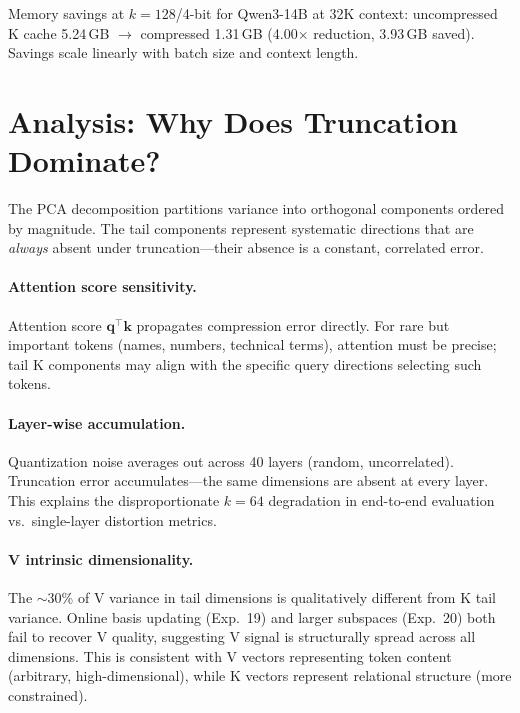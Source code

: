 \documentclass{article}
\begin{document}
Memory savings at $k{=}128$/4-bit for Qwen3-14B at 32K context:
uncompressed K cache 5.24\,GB $\rightarrow$ compressed 1.31\,GB (4.00$\times$
reduction, 3.93\,GB saved). Savings scale linearly with batch size and context
length.

\section{Analysis: Why Does Truncation Dominate?}
\label{sec:analysis}

The PCA decomposition partitions variance into orthogonal components ordered by
magnitude. The tail components represent systematic directions that are
\emph{always} absent under truncation---their absence is a constant, correlated
error.

\paragraph{Attention score sensitivity.}
Attention score $\mathbf{q}^\top\mathbf{k}$ propagates compression error directly.
For rare but important tokens (names, numbers, technical terms), attention must be
precise; tail K components may align with the specific query directions selecting
such tokens.

\paragraph{Layer-wise accumulation.}
Quantization noise averages out across 40 layers (random, uncorrelated).
Truncation error accumulates---the same dimensions are absent at every layer.
This explains the disproportionate $k{=}64$ degradation in end-to-end evaluation
vs.\ single-layer distortion metrics.

\paragraph{V intrinsic dimensionality.}
The $\sim$30\% of V variance in tail dimensions is qualitatively different from K
tail variance. Online basis updating (Exp.~19) and larger subspaces (Exp.~20)
both fail to recover V quality, suggesting V signal is structurally spread across
all dimensions. This is consistent with V vectors representing token content
(arbitrary, high-dimensional), while K vectors represent relational structure
(more constrained).

\end{document}
